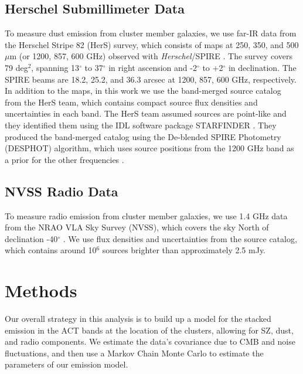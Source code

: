 \documentclass[a4paper,fleqn,usenatbib]{mnras}
\begin{document}
\subsection{Herschel Submillimeter Data}
To measure dust emission from cluster member galaxies, we use far-IR data from the Herschel Stripe 82 (HerS) survey, which consists of maps at 250, 350, and 500 $\mu$m (or 1200, 857, 600 GHz) observed with \textit{Herschel}/SPIRE \citep{2014ApJS..210...22V}. 
The survey covers 79 deg$^2$, spanning 13$^{\circ}$ to 37$^{\circ}$ in right ascension and -2$^{\circ}$ to +2$^{\circ}$ in declination. 
The SPIRE beams are 18.2, 25.2, and 36.3 arcsec at 1200, 857, 600 GHz, respectively. 
In addition to the maps, in this work we use the band-merged source catalog from the HerS team, which contains compact source flux densities and uncertainties in each band. 
The HerS team assumed sources are point-like and they identified them using the IDL software package STARFINDER \citep{2000A&AS..147..335D}. 
They produced the band-merged catalog using the De-blended SPIRE Photometry (DESPHOT) algorithm, which uses source positions from the 1200 GHz band as a prior for the other frequencies \citep{2010MNRAS.409...48R}.

\subsection{NVSS Radio Data}
To measure radio emission from cluster member galaxies, we use 1.4 GHz data from the NRAO VLA Sky Survey (NVSS), which covers the sky North of declination -40$^{\circ}$ \citep{1998AJ....115.1693C}.
We use flux densities and uncertainties from the source catalog, which contains around 10$^6$ sources brighter than approximately 2.5 mJy.


\section{Methods} \label{sec:methods}

Our overall strategy in this analysis is to build up a model for the stacked emission in the ACT bands at the location of the clusters, allowing for SZ, dust, and radio components.  
We estimate the data's covariance due to CMB and noise fluctuations, and then use a Markov Chain Monte Carlo to estimate the parameters of our emission model.
\end{document}

